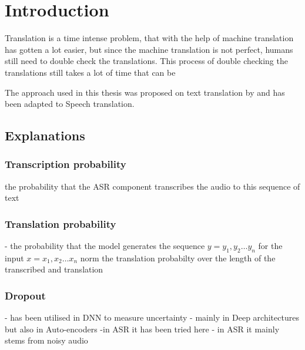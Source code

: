 
\chapter{Introduction}
\label{ch:Introduction}

Translation is a time intense problem, that with the help of machine translation has gotten a lot easier, but since the machine translation is not perfect, humans still need to double check the translations. This process of double checking the translations still takes a lot of time that can be 

The approach used in this thesis was proposed on text translation by \cite{fomicheva2020unsupervised} and has been adapted to Speech translation. 
\section{Explanations}
\subsection{Transcription probability}
the probability that the ASR component transcribes the audio to this sequence of text
\subsection{Translation probability}
- the probability that the model generates the sequence $y = y_1, y_2 \dots y_n$ for the input $x=x_1, x_2 \dots x_n$
norm the translation probabilty over the length of the transcribed and translation 


\subsection{Dropout}
- has been utilised in DNN to measure uncertainty
- mainly in Deep architectures but also in Auto-encoders \cite{}
-in ASR it has been tried here  \cite{8683086}
- in ASR it mainly stems from noisy audio 
